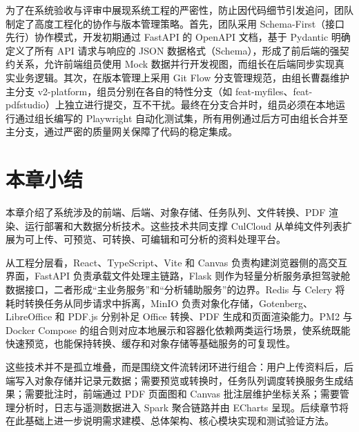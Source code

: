 为了在系统验收与评审中展现系统工程的严密性，防止因代码细节引发追问，团队制定了高度工程化的协作与版本管理策略。首先，团队采用 Schema-First（接口先行）协作模式，开发初期通过 FastAPI 的 OpenAPI 文档，基于 Pydantic 明确定义了所有 API 请求与响应的 JSON 数据格式（Schema），形成了前后端的强契约关系，允许前端组员使用 Mock 数据并行开发视图，而组长在后端同步实现真实业务逻辑。其次，在版本管理上采用 Git Flow 分支管理规范，由组长曹磊维护主分支 v2-platform，组员分别在各自的特性分支（如 feat-myfiles、feat-pdfstudio）上独立进行提交，互不干扰。最终在分支合并时，组员必须在本地运行通过组长编写的 Playwright 自动化测试集，所有用例通过后方可由组长合并至主分支，通过严密的质量网关保障了代码的稳定集成。

\section{本章小结}

本章介绍了系统涉及的前端、后端、对象存储、任务队列、文件转换、PDF 渲染、运行部署和大数据分析技术。这些技术共同支撑 CulCloud 从单纯文件列表扩展为可上传、可预览、可转换、可编辑和可分析的资料处理平台。

从工程分层看，React、TypeScript、Vite 和 Canvas 负责构建浏览器侧的高交互界面，FastAPI 负责承载文件处理主链路，Flask 则作为轻量分析服务承担驾驶舱数据接口，二者形成“主业务服务”和“分析辅助服务”的边界。Redis 与 Celery 将耗时转换任务从同步请求中拆离，MinIO 负责对象化存储，Gotenberg、LibreOffice 和 PDF.js 分别补足 Office 转换、PDF 生成和页面渲染能力。PM2 与 Docker Compose 的组合则对应本地展示和容器化依赖两类运行场景，使系统既能快速预览，也能保持转换、缓存和对象存储等基础服务的可复现性。

这些技术并不是孤立堆叠，而是围绕文件流转闭环进行组合：用户上传资料后，后端写入对象存储并记录元数据；需要预览或转换时，任务队列调度转换服务生成结果；需要批注时，前端通过 PDF 页面图和 Canvas 批注层维护坐标关系；需要管理分析时，日志与遥测数据进入 Spark 聚合链路并由 ECharts 呈现。后续章节将在此基础上进一步说明需求建模、总体架构、核心模块实现和测试验证方法。
